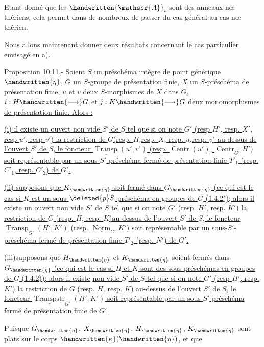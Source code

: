 
Etant donné que les $\handwritten{\mathscr{A}}_i$ sont des anneaux  nœ thériens, cela permet dans de nombreux de passer
du cas général au cas nœ thérien.

Nous allons maintenant donner deux résultats concernant le cas particulier envisagé en a).

\uline{Proposition 10.11.}- \uline{Soient $S$ un préschéma intègre de point générique $\handwritten{\eta}$, $G$ un $S$-groupe de présentation finie, $X$ un $S$-préschéma de présentation finie, $u$ et $v$ deux $S$-morphismes de $X$ dans $G$, $i:H\handwritten{\longrightarrow}G$ et $j:K\handwritten{\longrightarrow}G$ deux monomorphismes de présentation finie. Alors :}

\uline{(i) il existe un ouvert non vide $S'$ de $S$ tel que si on note $G'$ (resp $H'$, resp. $X'$, resp $u'$, resp $v'$) la restriction de $G$(resp. $H$,resp. $X$, resp. $u$,resp. $v$) au-dessus de l'ouvert $S'$ de $S$, le foncteur $\underline{\operatorname{Transp}}(u',v')$ (resp. $\underline{\operatorname{Centr}}(u')$, $\underline{\operatorname{Centr}}_{G'}H')$ soit représentable par un sous-$S'$-préschéma fermé de présentation finie $T'_1$ (resp. $C'_1$, resp. $C'_2$) de $G'$.}

\uline{(ii) supposons que $K_{\handwritten{\eta}}$ soit fermé dans $G_{\handwritten{\eta}}$ (ce qui est le cas si $K$ est un sous-$\deleted{p}S$-préschéma en groupes de $G$ (1.4.2)); alors il existe un ouvert non vide $S'$ de $S$ tel que si on note $G'$ (resp. $H'$, resp. $K'$) la restriction de $G$ (resp. $H$, resp. $K$)au-dessus de l'ouvert $S'$ de $S$, le foncteur $\underline{\operatorname{Transp}}_{G'}(H',K')$ (resp. $\underline{\operatorname{Norm}}_{G'}K')$ soit représentable par un sous-$S'$-préschéma fermé de présentation finie $T'_2$ (resp. $N'$) de $G'$.}

\uline{(iii)supposons que $H_{\handwritten{\eta}}$ et $K_{\handwritten{\eta}}$ soient fermés dans $G_{\handwritten{\eta}}$ (ce qui est le cas si $H$ et $K$ sont des sous-préschémas en groupes de $G$ (1.4.2)); alors il existe}  \uline{non vide $S'$ de $S$ tel que si on note $G'$ (resp $H'$, resp. $K'$) la restriction de $G$ (resp. $H$, resp. $K$) au-dessus de l'ouvert $S'$ de $S$, le foncteur $\underline{\operatorname{Transpstr}}_{G'}(H',K')$ soit représentable par un sous-$S'$-préschéma fermé de présentation finie de $G'$.}

Puisque $G_{\handwritten{\eta}}$, $X_{\handwritten{\eta}}$, $H_{\handwritten{\eta}}$, $K_{\handwritten{\eta}}$ sont plats sur le corps $\handwritten{\kappa}(\handwritten{\eta})$, et que
